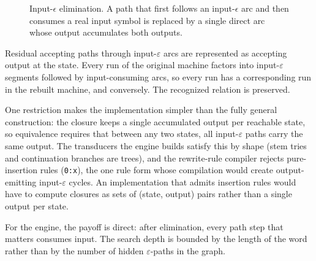 \documentclass[11pt]{article}
\theoremstyle{definition}
\theoremstyle{plain}
\theoremstyle{remark}
\newcommand{\eps}{\varepsilon}
\begin{document}
\begin{figure}[H]
\centering
{}
\caption{Input-\(\epsilon\) elimination. A path that first follows an
input-\(\epsilon\) arc and then consumes a real input symbol is replaced by a
single direct arc whose output accumulates both outputs.}
\label{fig:eps-elim}
\end{figure}

Residual accepting paths through input-$\eps$ arcs are represented as accepting output at the
state. Every run of the original machine factors into input-$\eps$ segments followed by
input-consuming arcs, so every run has a corresponding run in the rebuilt machine, and conversely.
The recognized relation is preserved.

One restriction makes the implementation simpler than the fully general construction:
the closure keeps a single accumulated output per reachable state, so equivalence
requires that between any two states, all input-$\eps$ paths carry the same output.
The transducers the engine builds satisfy this by shape (stem tries and continuation
branches are trees), and the rewrite-rule compiler rejects pure-insertion rules
(\texttt{0:x}), the one rule form whose compilation would create output-emitting
input-$\eps$ cycles. An implementation that admits insertion rules would have to
compute closures as sets of (state, output) pairs rather than a single output per
state.

For the engine, the payoff is direct: after elimination, every path step that matters consumes
input. The search depth is bounded by the length of the word rather than by the number of hidden
$\eps$-paths in the graph.
\end{document}
